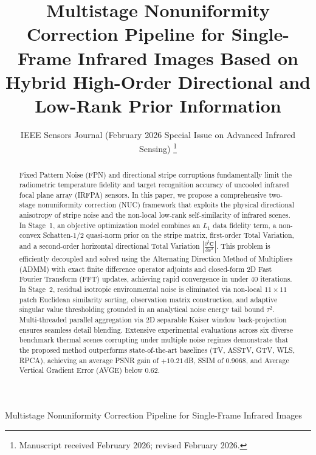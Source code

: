 \documentclass[lettersize,journal]{IEEEtran}
\begin{document}
\title{Multistage Nonuniformity Correction Pipeline for Single-Frame Infrared Images Based on Hybrid High-Order Directional and Low-Rank Prior Information}

\author{IEEE Sensors Journal (February 2026 Special Issue on Advanced Infrared Sensing)
\thanks{Manuscript received February 2026; revised February 2026.}}

%
{Multistage Nonuniformity Correction Pipeline for Single-Frame Infrared Images}

\maketitle

\begin{abstract}
Fixed Pattern Noise (FPN) and directional stripe corruptions fundamentally limit the radiometric temperature fidelity and target recognition accuracy of uncooled infrared focal plane array (IRFPA) sensors. In this paper, we propose a comprehensive two-stage nonuniformity correction (NUC) framework that exploits the physical directional anisotropy of stripe noise and the non-local low-rank self-similarity of infrared scenes. In Stage~1, an objective optimization model combines an $L_1$ data fidelity term, a non-convex Schatten-$1/2$ quasi-norm prior on the stripe matrix, first-order Total Variation, and a second-order horizontal directional Total Variation $|\frac{\partial^2 \mathbf{C}}{\partial x^2}|$. This problem is efficiently decoupled and solved using the Alternating Direction Method of Multipliers (ADMM) with exact finite difference operator adjoints and closed-form 2D Fast Fourier Transform (FFT) updates, achieving rapid convergence in under 40 iterations. In Stage~2, residual isotropic environmental noise is eliminated via non-local $11 \times 11$ patch Euclidean similarity sorting, observation matrix construction, and adaptive singular value thresholding grounded in an analytical noise energy tail bound $\tau^2$. Multi-threaded parallel aggregation via 2D separable Kaiser window back-projection ensures seamless detail blending. Extensive experimental evaluations across six diverse benchmark thermal scenes corrupting under multiple noise regimes demonstrate that the proposed method outperforms state-of-the-art baselines (TV, ASSTV, GTV, WLS, RPCA), achieving an average PSNR gain of $+10.21$\,dB, SSIM of $0.9068$, and Average Vertical Gradient Error (AVGE) below $0.62$.
\end{abstract}
\end{document}
